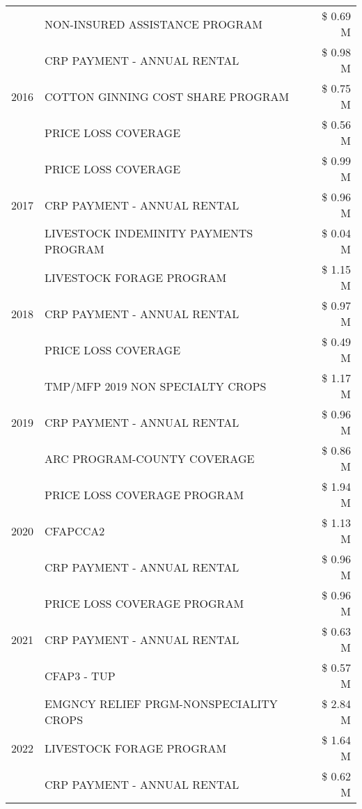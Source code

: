 \begin{tabular}{llr}
 & NON-INSURED ASSISTANCE PROGRAM & \$ 0.69 M \\
\cline{1-3}
\multirow[t]{3}{*}{2016} & CRP PAYMENT - ANNUAL RENTAL & \$ 0.98 M \\
 & COTTON GINNING COST SHARE PROGRAM & \$ 0.75 M \\
 & PRICE LOSS COVERAGE & \$ 0.56 M \\
\cline{1-3}
\multirow[t]{3}{*}{2017} & PRICE LOSS COVERAGE & \$ 0.99 M \\
 & CRP PAYMENT - ANNUAL RENTAL & \$ 0.96 M \\
 & LIVESTOCK INDEMINITY PAYMENTS PROGRAM & \$ 0.04 M \\
\cline{1-3}
\multirow[t]{3}{*}{2018} & LIVESTOCK FORAGE PROGRAM & \$ 1.15 M \\
 & CRP PAYMENT - ANNUAL RENTAL & \$ 0.97 M \\
 & PRICE LOSS COVERAGE & \$ 0.49 M \\
\cline{1-3}
\multirow[t]{3}{*}{2019} & TMP/MFP 2019 NON SPECIALTY CROPS & \$ 1.17 M \\
 & CRP PAYMENT - ANNUAL RENTAL & \$ 0.96 M \\
 & ARC PROGRAM-COUNTY COVERAGE & \$ 0.86 M \\
\cline{1-3}
\multirow[t]{3}{*}{2020} & PRICE LOSS COVERAGE PROGRAM & \$ 1.94 M \\
 & CFAPCCA2 & \$ 1.13 M \\
 & CRP PAYMENT - ANNUAL RENTAL & \$ 0.96 M \\
\cline{1-3}
\multirow[t]{3}{*}{2021} & PRICE LOSS COVERAGE PROGRAM & \$ 0.96 M \\
 & CRP PAYMENT - ANNUAL RENTAL & \$ 0.63 M \\
 & CFAP3 - TUP & \$ 0.57 M \\
\cline{1-3}
\multirow[t]{3}{*}{2022} & EMGNCY RELIEF PRGM-NONSPECIALITY CROPS & \$ 2.84 M \\
 & LIVESTOCK FORAGE PROGRAM & \$ 1.64 M \\
 & CRP PAYMENT - ANNUAL RENTAL & \$ 0.62 M \\
\cline{1-3}
\bottomrule
\end{tabular}
